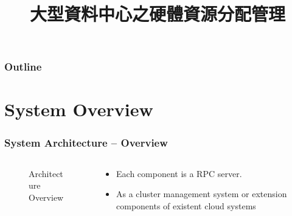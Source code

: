 \documentclass{beamer}
\title{大型資料中心之硬體資源分配管理}
\begin{document}
\begin{frame}
  \titlepage
  \label{title-page}
\end{frame}
\begin{frame}
  \frametitle{Outline}
  \tableofcontents[subsectionstyle=show/hide]
\end{frame}


\section{System Overview}
\begin{frame}
  \frametitle{System Architecture -- Overview}
  \begin{columns}
    \begin{column}{.5\textwidth}
      \begin{figure}
        \resizebox{\linewidth}{!}{
          
        }
        \caption{Architecture Overview}
        \label{fig:archi-overview}
      \end{figure}
    \end{column}
    \begin{column}{.5\textwidth}
      \begin{itemize}
        \item Each component is a RPC server.
        \item As a cluster management system or extension
          components of existent cloud systems
      \end{itemize}
    \end{column}
  \end{columns}
\end{frame}


\end{document}
